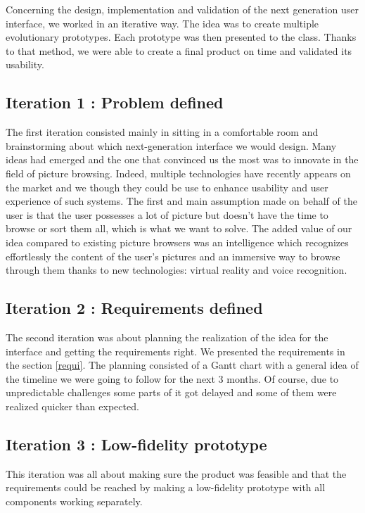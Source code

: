 \documentclass[11pt,a4paper]{article}
\begin{document}
Concerning the design, implementation and validation of the next generation user interface, we worked in an iterative way.
The idea was to create multiple evolutionary prototypes. Each prototype was then presented to the class. Thanks to that method, we were able to create a final product on time and validated its usability.

\subsection{Iteration 1 : Problem defined}

The first iteration consisted mainly in sitting in a comfortable room and brainstorming about which next-generation interface we would design. Many ideas had emerged and the one that convinced us the most was to innovate in the field of picture browsing. Indeed, multiple technologies have recently appears on the market and we though they could be use to enhance usability and user experience of such systems.
The first and main assumption made on behalf of the user is that the user possesses a lot of picture but doesn't have the time to browse or sort them all, which is what we want to solve.
The added value of our idea compared to existing picture browsers was an intelligence which recognizes effortlessly the content of the user's pictures and an immersive way to browse through them thanks to new technologies: virtual reality and voice recognition.

\subsection{Iteration 2 : Requirements defined}

The second iteration was about planning the realization of the idea for the interface and getting the requirements right. We presented the requirements in the section \ref{requi}. The planning consisted of a Gantt chart with a general idea of the timeline we were going to follow for the next 3 months. Of course, due to unpredictable challenges some parts of it got delayed and some of them were realized quicker than expected.

\subsection{Iteration 3 : Low-fidelity prototype}

This iteration was all about making sure the product was feasible and that the requirements could be reached by making a low-fidelity prototype with all components working separately.
\end{document}
